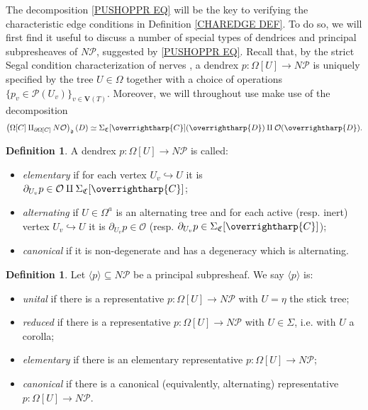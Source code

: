 \documentclass[a4paper,10pt
,draft
]{article}%
\numberwithin{equation}{section}
\numberwithin{figure}{section}
\theoremstyle{definition} %
\newtheorem{definition}[equation]{Definition}%
\newcommand{\vect}[1]{\text{\overrightharp{\ensuremath{#1}}}}
\renewcommand{\O}{\ensuremath{\mathcal O}}
\newcommand{\1}{\ensuremath{\mathbbm 1}}%
\begin{document}
The decomposition \eqref{PUSHOPPR EQ}
will be the key to verifying the 
characteristic edge conditions in Definition \ref{CHAREDGE DEF}.
To do so, we will first find it useful to discuss a number of special types of dendrices and principal subpresheaves of $N \mathcal{P}$, suggested by \eqref{PUSHOPPR EQ}.
%
Recall that, by the strict Segal condition characterization of nerves \cite[Cor. 2.7]{CM13a},
a dendrex $p \colon \Omega[U] \to N \mathcal{P}$
is uniquely specified by the tree $U \in \Omega$ together with a choice of operations
$\{p_v \in \mathcal{P}(U_v)\}_{v \in \boldsymbol{V}(T)}$.
Moreover, we will throughout use make use of the decomposition 
\[
	\left(
	\Omega[C] \amalg_{\partial \Omega[C]} N \O
	\right)_{\mathfrak{d}} (D)
\simeq
	\Sigma_{\mathfrak{C}}[\vect{C}](\vect{D}) \amalg \O(\vect{D}).
\]


\begin{definition}
	A dendrex $p\colon \Omega[U] \to N \mathcal{P}$ 
	is called:
	\begin{itemize}
		\item \emph{elementary} if for each vertex $U_v \hookrightarrow U$
		it is $ \partial_{U_v} p \in \mathcal{O} \amalg \Sigma_{\mathfrak{C}}[\vect{C}]$; %
		\item \emph{alternating} if $U \in \Omega^a$ is an alternating tree
		and for each active (resp. inert) vertex 
		$U_v \hookrightarrow U$ it is
		$\partial_{U_v} p \in \O$
		(resp. $ \partial_{U_v} p \in \Sigma_{\mathfrak{C}}[\vect{C}]$);
		\item \emph{canonical} if it is non-degenerate and has a degeneracy which is alternating.
	\end{itemize}
\end{definition}


\begin{definition}
	Let $\langle p \rangle \subseteq N \mathcal{P}$ be 
	a principal subpresheaf. 
	We say $\langle p \rangle$ is:
	\begin{itemize}
		\item \emph{unital} if there is a representative
		$p\colon \Omega[U] \to N \mathcal{P}$ with $U=\eta$ the stick tree;
		\item \emph{reduced} if there is a representative
		$p\colon \Omega[U] \to N \mathcal{P}$ with $U \in \Sigma$, i.e. with $U$ a corolla;
		\item \emph{elementary} 
		if there is an elementary representative
		$p\colon \Omega[U] \to N \mathcal{P}$;
		\item \emph{canonical} 
		if there is a canonical (equivalently, alternating) representative
		$p\colon \Omega[U] \to N \mathcal{P}$.
	\end{itemize}
\end{definition}
\end{document}
